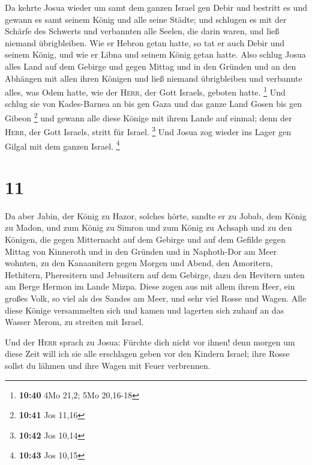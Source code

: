  Da kehrte Josua wieder um samt dem ganzen Israel gen
Debir und bestritt es  und gewann es samt seinem König
und alle seine Städte; und schlugen es mit der Schärfe des Schwerts und
verbannten alle Seelen, die darin waren, und ließ niemand übrigbleiben.
Wie er Hebron getan hatte, so tat er auch Debir und seinem König, und
wie er Libna und seinem König getan hatte.  Also schlug
Josua alles Land auf dem Gebirge und gegen Mittag und in den Gründen und
an den Abhängen mit allen ihren Königen und ließ niemand übrigbleiben
und verbannte alles, was Odem hatte, wie der \textsc{Herr}, der Gott
Israels, geboten hatte. \footnote{\textbf{10:40} 4Mo 21,2; 5Mo 20,16-18}
 Und schlug sie von Kades-Barnea an bis gen Gaza und das
ganze Land Gosen bis gen Gibeon \footnote{\textbf{10:41} Jos 11,16}
 und gewann alle diese Könige mit ihrem Lande auf einmal;
denn der \textsc{Herr}, der Gott Israels, stritt für Israel. \footnote{\textbf{10:42}
  Jos 10,14}  Und Josua zog wieder ins Lager gen Gilgal
mit dem ganzen Israel. \footnote{\textbf{10:43} Jos 10,15}

\hypertarget{section-3}{%
\section{11}\label{section-3}}

 Da aber Jabin, der König zu Hazor, solches hörte, sandte
er zu Jobab, dem König zu Madon, und zum König zu Simron und zum König
zu Achsaph  und zu den Königen, die gegen Mitternacht auf
dem Gebirge und auf dem Gefilde gegen Mittag von Kinneroth und in den
Gründen und in Naphoth-Dor am Meer wohnten,  zu den
Kanaanitern gegen Morgen und Abend, den Amoritern, Hethitern,
Pheresitern und Jebusitern auf dem Gebirge, dazu den Hevitern unten am
Berge Hermon im Lande Mizpa.  Diese zogen aus mit allem
ihrem Heer, ein großes Volk, so viel als des Sandes am Meer, und sehr
viel Rosse und Wagen.  Alle diese Könige versammelten sich
und kamen und lagerten sich zuhauf an das Wasser Merom, zu streiten mit
Israel.

 Und der \textsc{Herr} sprach zu Josua: Fürchte dich nicht
vor ihnen! denn morgen um diese Zeit will ich sie alle erschlagen geben
vor den Kindern Israel; ihre Rosse sollst du lähmen und ihre Wagen mit
Feuer verbrennen.

